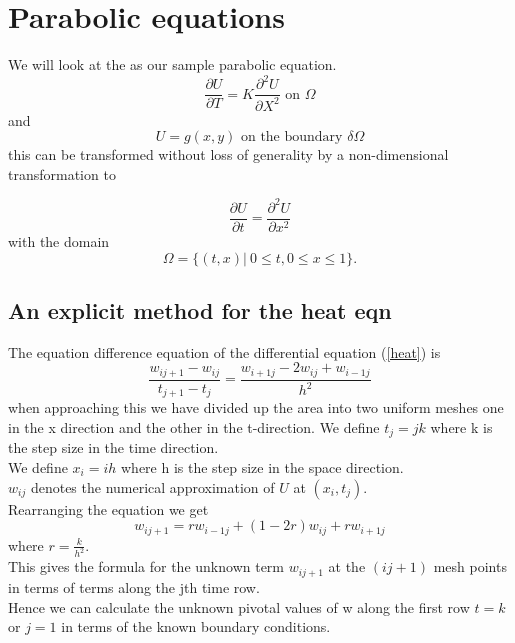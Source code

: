 \chapter{Parabolic equations}
We will look at the  as our sample parabolic equation.
\[ \frac{\partial U}{\partial T}=K\frac{\partial^2U }{\partial X^2} \mbox{ on } \Omega \]
and 
\[ U=g(x,y) \mbox{ on the boundary } \delta\Omega \]
this can be transformed without loss of generality by a non-dimensional transformation to

\begin{equation}\label{heat} \frac{\partial U}{\partial t}=\frac{\partial^2U }{\partial x^2}\end{equation}
with the domain
\[\Omega=\{(t,x)| \ 0\leq t, 0 \leq x \leq 1\}. \]

\section{An explicit method for the heat eqn}
The equation difference equation of the differential equation (\ref{heat}) is
\begin{equation}
\frac{w_{ij+1}-w_{ij}}{t_{j+1}-t_{j}}=\frac{w_{i+1j}-2w_{ij}+w_{i-1j}}{h^2}
\end{equation}
when approaching this we have divided up the area into
two uniform meshes one in the x direction and the other in the t-direction.
We define $t_j=jk$ where k is the step size in the time direction.\\
We define $x_i=ih$ where h is the step size in the space direction.\\
$w_{ij}$ denotes the numerical approximation of $U$ at $(x_i,t_j)$.\\
Rearranging the equation we get
\begin{equation}\label{disc heat}
w_{ij+1}=rw_{i-1j}+(1-2r)w_{ij}+rw_{i+1j}
\end{equation}
where $r=\frac{k}{h^2}$.\\
This gives the formula for the unknown term $w_{ij+1}$ at the $(ij+1)$ mesh points
in terms of terms along the jth time row.\\
Hence we can calculate the unknown pivotal values of w along the first row $t=k$ or $j=1$ in terms of the known boundary conditions.
